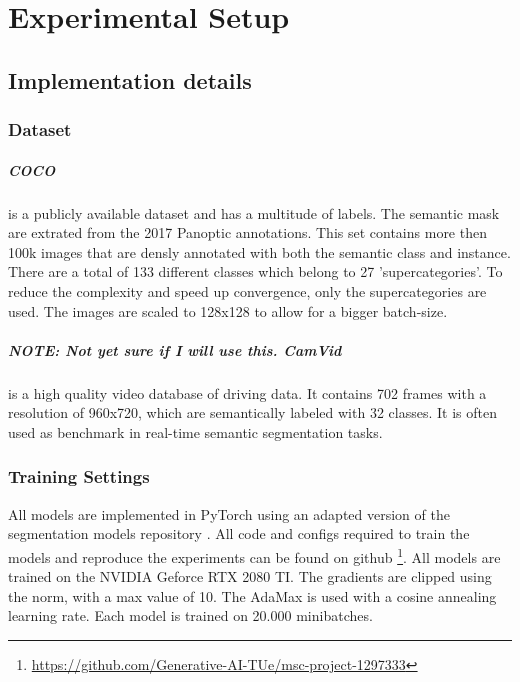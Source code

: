 \chapter{Experimental Setup}\label{chapter:second_real_chapter}

\section{Implementation details}
\subsection{Dataset}
\paragraph{COCO\cite{lin2015microsoftcococommonobjects}} is a publicly available dataset and has a multitude of labels. The semantic mask are extrated from the 2017 Panoptic annotations. This set contains more then 100k images that are densly annotated with both the semantic class and instance. There are a total of 133 different classes which belong to 27 'supercategories'. To reduce the complexity and speed up convergence, only the supercategories are used. The images are scaled to 128x128 to allow for a bigger batch-size.

\paragraph{NOTE: Not yet sure if I will use this. CamVid\cite{BrostowFC:PRL2008,BrostowSFC:ECCV08}} is a high quality video database of driving data. It contains 702 frames with a resolution of 960x720, which are semantically labeled with 32 classes. It is often used as benchmark in real-time semantic segmentation tasks.


\subsection{Training Settings}
All models are implemented in PyTorch \cite{Ansel_PyTorch_2_Faster_2024} using an adapted version of the segmentation models repository \cite{Iakubovskii:2019}. All code and configs required to train the models and reproduce the experiments can be found on github \footnote[1]{\url{https://github.com/Generative-AI-TUe/msc-project-1297333}}. All models are trained on the NVIDIA Geforce RTX 2080 TI. The gradients are clipped using the norm, with a max value of 10. The AdaMax\cite{kingma2017adammethodstochasticoptimization} is used with a cosine annealing learning rate. Each model is trained on 20.000 minibatches.

